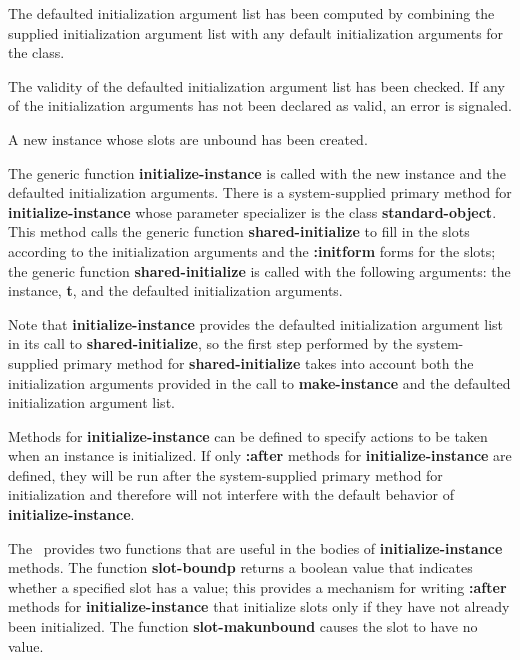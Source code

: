 \beginlist 

\item{\bull} The defaulted initialization argument list has been computed by
combining the supplied initialization argument list with any default
initialization arguments for the class.

\item{\bull} The validity of the defaulted initialization argument
list has been checked.  If any of the initialization arguments has not
been declared as valid, an error is signaled.

\item{\bull} A new instance whose slots are unbound has been created.

\endlist

The generic function {\bf initialize-instance} is called with the
new instance and the defaulted initialization arguments.  There is
a system-supplied primary method for {\bf initialize-instance}
whose parameter specializer is the class {\bf standard-object}.  This
method calls the generic function {\bf shared-initialize} to fill in
the slots according to the initialization arguments and the {\bf
:initform} forms for the slots; the generic function {\bf
shared-initialize} is called with the following arguments: the instance,
{\bf t}, and the defaulted initialization arguments.

Note that {\bf initialize-instance} provides the defaulted
initialization argument list in its call to {\bf shared-initialize},
so the first step performed by the system-supplied primary method for
{\bf shared-initialize} takes into account both the initialization
arguments provided in the call to {\bf make-instance} and the
defaulted initialization argument list.

Methods for {\bf initialize-instance} can be defined to specify
actions to be taken when an instance is initialized.  If only {\bf :after}
methods for {\bf initialize-instance} are defined, they will be
run after the system-supplied primary method for initialization and
therefore will not interfere with the default behavior of {\bf
initialize-instance}.

The \OS\ provides two functions that are useful in the bodies of {\bf
initialize-instance} methods.  The function {\bf slot-boundp}
returns a boolean value that indicates whether a specified slot has a
value; this provides a mechanism for writing {\bf :after} methods for
{\bf initialize-instance} that initialize slots only if they have
not already been initialized.  The function {\bf slot-makunbound}
causes the slot to have no value.

